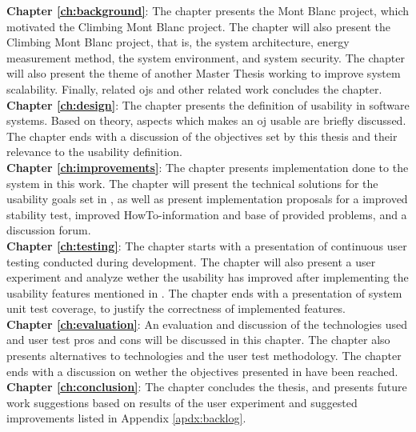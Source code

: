 \textbf{Chapter \ref{ch:background}}: The chapter presents the Mont Blanc project, which motivated the Climbing Mont Blanc project. The chapter will also present the Climbing Mont Blanc project, that is, the system architecture, energy measurement method, the system environment, and system security. The chapter will also present the theme of another Master Thesis working to improve system scalability. Finally, related \glspl{oj} and other related work concludes the chapter. \\

\textbf{Chapter \ref{ch:design}}: The chapter presents the definition of usability in software systems. Based on theory, aspects which makes an \gls{oj} usable are briefly discussed. The chapter ends with a discussion of the objectives set by this thesis and their relevance to the usability definition. \\

\textbf{Chapter \ref{ch:improvements}}: The chapter presents implementation done to the system in this work. The chapter will present the technical solutions for the usability goals set in , as well as present implementation proposals for a improved stability test, improved HowTo-information and base of provided problems, and a discussion forum. \\

\textbf{Chapter \ref{ch:testing}}: The chapter starts with a presentation of continuous user testing conducted during development. The chapter will also present a user experiment and analyze wether the usability has improved after implementing the usability features mentioned in . The chapter ends with a presentation of system unit test coverage, to justify the correctness of implemented features. \\

\textbf{Chapter \ref{ch:evaluation}}: An evaluation and discussion of the technologies used and user test pros and cons will be discussed in this chapter. The chapter also presents alternatives to technologies and the user test methodology. The chapter ends with a discussion on wether the objectives presented in  have been reached. \\

\textbf{Chapter \ref{ch:conclusion}}: The chapter concludes the thesis, and presents future work suggestions based on results of the user experiment and suggested improvements listed in Appendix \ref{apdx:backlog}.



